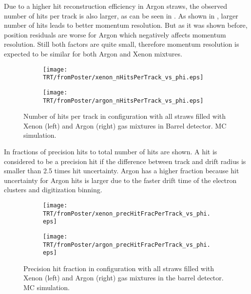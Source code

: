 
Due to a higher hit reconstruction efficiency in Argon straws, the observed number of hits per track is also larger, as can be seen in . 
As shown in , larger number of hits leads to better momentum resolution. But as it was shown before, position residuals are
worse for Argon which negatively affects momentum resolution. Still both factors are quite small, therefore momentum resolution is expected to be similar for
both Argon and Xenon mixtures.

\begin{figure}

\begin{subfigure}{.5\textwidth}
  \centering
  \texttt{[image: TRT/fromPoster/xenon\_nHitsPerTrack\_vs\_phi.eps]}
\end{subfigure}%
\begin{subfigure}{.5\textwidth}
  \centering
  \texttt{[image: TRT/fromPoster/argon\_nHitsPerTrack\_vs\_phi.eps]}
\end{subfigure}

\caption{Number of hits per track in configuration with all straws filled with Xenon (left) and Argon (right) gas mixtures in Barrel detector. MC simulation.}
  \label{fig:nHitsPerTrack}
\end{figure}

In  fractions of precision hits to total number of hits are shown. A hit is considered to be a precision
hit if the difference between track and drift radius is smaller than 2.5 times hit uncertainty. Argon has a higher fraction because hit uncertainty
for Argon hits is larger due to the faster drift time of the electron clusters and digitization binning. 

\begin{figure}

\begin{subfigure}{.5\textwidth}
  \centering
  \texttt{[image: TRT/fromPoster/xenon\_precHitFracPerTrack\_vs\_phi.eps]}
\end{subfigure}%
\begin{subfigure}{.5\textwidth}
  \centering
  \texttt{[image: TRT/fromPoster/argon\_precHitFracPerTrack\_vs\_phi.eps]}
\end{subfigure}

\caption{Precision hit fraction in configuration with all straws filled with Xenon (left) and Argon (right) gas mixtures in the barrel detector. MC simulation.}
  \label{fig:precHitFracPerTrack}
\end{figure}

